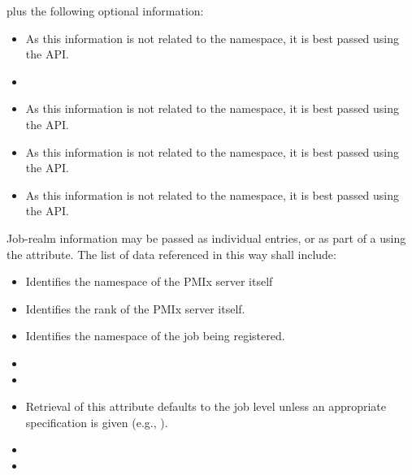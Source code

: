 plus the following optional information:

\begin{itemize}
    \item {}As this information is not related to the namespace, it is best passed using the  \ac{API}.
    \pasteAttributeItemEnd
    \item {}
    \item {}As this information is not related to the namespace, it is best passed using the  \ac{API}.
    \pasteAttributeItemEnd
    \item {}As this information is not related to the namespace, it is best passed using the  \ac{API}.
    \pasteAttributeItemEnd
    \item {}As this information is not related to the namespace, it is best passed using the  \ac{API}.
    \pasteAttributeItemEnd
\end{itemize}

Job-realm information may be passed as individual  entries, or as part of a  using the  attribute. The list of data referenced in this way shall include:

\begin{itemize}
    \item {}Identifies the namespace of the \ac{PMIx} server itself
    \pasteAttributeItemEnd
    \item {}Identifies the rank of the \ac{PMIx} server itself.
    \pasteAttributeItemEnd
    \item {}Identifies the namespace of the job being registered.
    \pasteAttributeItemEnd
    \item {}
    \item {}
    \item {}Retrieval of this attribute defaults to the job level unless an appropriate specification is given (e.g., ).
    \pasteAttributeItemEnd
    \item {}
    \item {}
\end{itemize}

